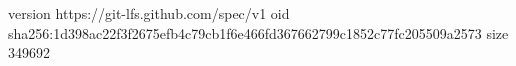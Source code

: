 version https://git-lfs.github.com/spec/v1
oid sha256:1d398ac22f3f2675efb4c79cb1f6e466fd367662799c1852c77fc205509a2573
size 349692
